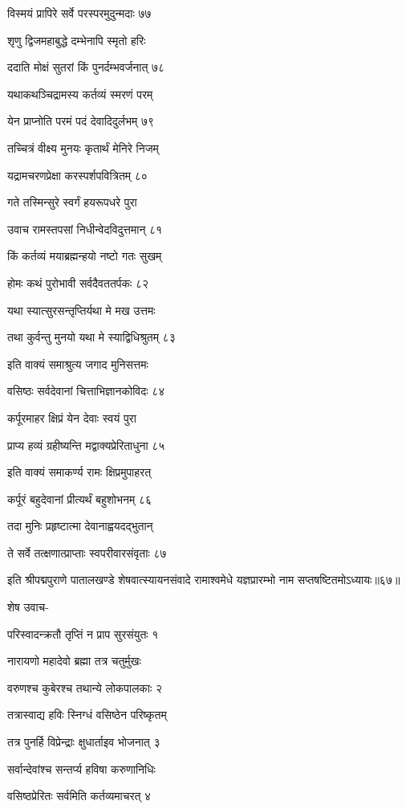 विस्मयं प्रापिरे सर्वे परस्परमुदुन्मदाः ७७

शृणु द्विजमहाबुद्धे दम्भेनापि स्मृतो हरिः

ददाति मोक्षं सुतरां किं पुनर्दम्भवर्जनात् ७८

यथाकथञ्चिद्रामस्य कर्तव्यं स्मरणं परम्

येन प्राप्नोति परमं पदं देवादिदुर्लभम् ७९

तच्चित्रं वीक्ष्य मुनयः कृतार्थं मेनिरे निजम्

यद्रामचरणप्रेक्षा करस्पर्शपवित्रितम् ८०

गते तस्मिन्सुरे स्वर्गं हयरूपधरे पुरा

उवाच रामस्तपसां निधीन्वेदविदुत्तमान् ८१

किं कर्तव्यं मयाब्रह्मन्हयो नष्टो गतः सुखम्

होमः कथं पुरोभावी सर्वदैवततर्पकः ८२

यथा स्यात्सुरसन्तृप्तिर्यथा मे मख उत्तमः

तथा कुर्वन्तु मुनयो यथा मे स्याद्विधिश्रुतम् ८३

इति वाक्यं समाश्रुत्य जगाद मुनिसत्तमः

वसिष्ठः सर्वदेवानां चित्ताभिज्ञानकोविदः ८४

कर्पूरमाहर क्षिप्रं येन देवाः स्वयं पुरा

प्राप्य हव्यं ग्रहीष्यन्ति मद्वाक्यप्रेरिताधुना ८५

इति वाक्यं समाकर्ण्य रामः क्षिप्रमुपाहरत्

कर्पूरं बहुदेवानां प्रीत्यर्थं बहुशोभनम् ८६

तदा मुनिः प्रहृष्टात्मा देवानाह्वयदद्भुतान्

ते सर्वे तत्क्षणात्प्राप्ताः स्वपरीवारसंवृताः ८७

इति श्रीपद्मपुराणे पातालखण्डे शेषवात्स्यायनसंवादे रामाश्वमेधे यज्ञप्रारम्भो नाम सप्तषष्टितमोऽध्यायः॥६७॥


शेष उवाच-

परिस्वादन्क्रतौ तृप्तिं न प्राप सुरसंयुतः १

नारायणो महादेवो ब्रह्मा तत्र चतुर्मुखः

वरुणश्च कुबेरश्च तथान्ये लोकपालकाः २

तत्रास्वाद्य हविः स्निग्धं वसिष्ठेन परिष्कृतम्

तत्र पुनर्हि विप्रेन्द्राः क्षुधार्ताइव भोजनात् ३

सर्वान्देवांश्च सन्तर्प्य हविषा करुणानिधिः

वसिष्ठप्रेरितः सर्वमिति कर्तव्यमाचरत् ४

